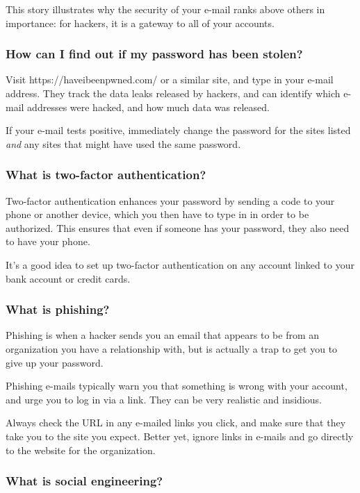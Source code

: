 This story illustrates why the security of your e-mail ranks above others in importance: for hackers, it is a gateway to all of your accounts.

\subsubsection{How can I find out if my password has been stolen?}

Visit https://haveibeenpwned.com/ or a similar site, and type in your e-mail address. They track the data leaks released by hackers, and can identify which e-mail addresses were hacked, and how much data was released.

If your e-mail tests positive, immediately change the password for the sites listed \textit{and} any sites that might have used the same password. 

\subsubsection{What is two-factor authentication?}

Two-factor authentication enhances your password by sending a code to your phone or another device, which you then have to type in in order to be authorized. This ensures that even if someone has your password, they also need to have your phone.

It's a good idea to set up two-factor authentication on any account linked to your bank account or credit cards.

\subsubsection{What is phishing?}

Phishing is when a hacker sends you an email that appears to be from an organization you have a relationship with, but is actually a trap to get you to give up your password.

Phishing e-mails typically warn you that something is wrong with your account, and urge you to log in via a link. They can be very realistic and insidious.

Always check the URL in any e-mailed links you click, and make sure that they take you to the site you expect. Better yet, ignore links in e-mails and go directly to the website for the organization.

\subsubsection{What is social engineering?}

